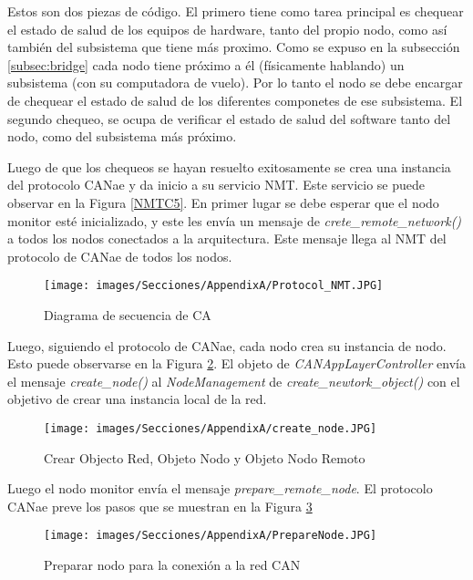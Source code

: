 Estos son dos piezas de código. El primero tiene como tarea principal es
chequear el estado de salud de los equipos de hardware, tanto
del propio nodo, como así también del subsistema que tiene más proximo.
Como se expuso en la subsección \ref{subsec:bridge} cada nodo tiene
próximo a él (físicamente hablando) un subsistema (con su computadora
de vuelo). Por lo tanto el nodo se debe encargar de chequear el
estado de salud de los diferentes componetes de ese subsistema. El
segundo chequeo, se ocupa de verificar el estado de salud del software
tanto del nodo, como del subsistema más próximo.

Luego de que los chequeos se hayan resuelto exitosamente se crea una
instancia del protocolo CANae y da inicio a su servicio NMT. Este
servicio se puede observar en la Figura \ref{NMTC5}. En primer lugar
se debe esperar que el nodo monitor esté inicializado, y este les
envía un mensaje de \textit{crete\_remote\_network()} a todos los
nodos conectados a la arquitectura. Este mensaje llega al NMT del
protocolo de CANae de todos los nodos.

\begin{figure}[h!]
 \centering
 \texttt{[image: images/Secciones/AppendixA/Protocol\_NMT.JPG]}
  \caption{Diagrama de secuencia de CA}
\label{fig:NMTC5}
\end{figure}

Luego, siguiendo el protocolo de CANae, cada nodo crea su instancia de
nodo. Esto puede observarse en la Figura \ref{fig:CreateNodeNMTC5}.
El objeto de \textit{CANAppLayerController} envía el mensaje \textit{
  create\_node()} al \textit{NodeManagement} de \textit{create\_newtork\_object()} con el objetivo de crear una instancia local de la red.


\begin{figure}[h!]
 \centering
 \texttt{[image: images/Secciones/AppendixA/create\_node.JPG]}
  \caption{Crear Objecto Red, Objeto Nodo y Objeto Nodo Remoto}
  \label{fig:CreateNodeNMTC5}
\end{figure}

Luego el nodo monitor envía el mensaje \textit{prepare\_remote\_node}.
El protocolo CANae preve los pasos que se muestran en la Figura
\ref{fig:PrepareNodeC5}

\begin{figure}[h!]
 \centering
 \texttt{[image: images/Secciones/AppendixA/PrepareNode.JPG]}
  \caption{Preparar nodo para la conexión a la red CAN}
  \label{fig:PrepareNodeC5}
\end{figure}

